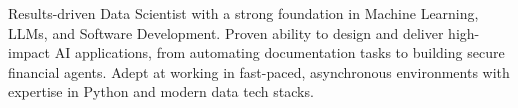 


\begin{cvparagraph}

Results-driven Data Scientist with a strong foundation in Machine Learning, LLMs, and Software Development. Proven ability to design and deliver high-impact AI applications, from automating documentation tasks to building secure financial agents. Adept at working in fast-paced, asynchronous environments with expertise in Python and modern data tech stacks.
\end{cvparagraph}
